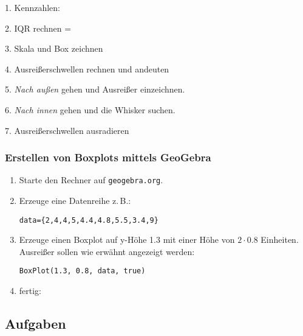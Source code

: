1. Kennzahlen:


2. IQR rechnen = 

3. Skala und Box zeichnen

4. Ausreißerschwellen rechnen und andeuten


5. \textit{Nach außen} gehen und Ausreißer einzeichnen.

6. \textit{Nach innen} gehen und die Whisker suchen.

7. Ausreißerschwellen ausradieren



\newpage

\subsubsection{Erstellen von Boxplots mittels GeoGebra}
\begin{enumerate}
\item Starte den Rechner auf \texttt{geogebra.org}.
\item Erzeuge eine Datenreihe z.\,B.:

\texttt{data=\{2,4,4,5,4.4,4.8,5.5,3.4,9\}}


\item Erzeuge einen Boxplot auf y-Höhe 1.3 mit einer Höhe von
  $2\cdot{}0.8$ Einheiten. Ausreißer sollen wie erwähnt angezeigt
  werden:

  \texttt{BoxPlot(1.3, 0.8, data, true)}

\item fertig:


  
\end{enumerate}

\subsection*{Aufgaben}

